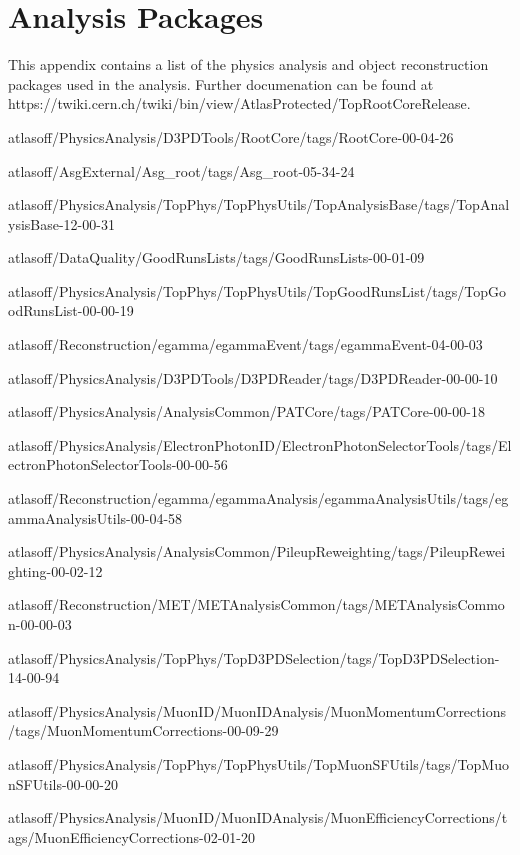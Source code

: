\clearpage
\section{Analysis Packages}
\label{app:packages}
This appendix contains a list of the physics analysis and object reconstruction packages used in the analysis. Further documenation can be found at https://twiki.cern.ch/twiki/bin/view/AtlasProtected/TopRootCoreRelease.

\tiny

atlasoff/PhysicsAnalysis/D3PDTools/RootCore/tags/RootCore-00-04-26

atlasoff/AsgExternal/Asg\_root/tags/Asg\_root-05-34-24

atlasoff/PhysicsAnalysis/TopPhys/TopPhysUtils/TopAnalysisBase/tags/TopAnalysisBase-12-00-31

atlasoff/DataQuality/GoodRunsLists/tags/GoodRunsLists-00-01-09

atlasoff/PhysicsAnalysis/TopPhys/TopPhysUtils/TopGoodRunsList/tags/TopGoodRunsList-00-00-19

atlasoff/Reconstruction/egamma/egammaEvent/tags/egammaEvent-04-00-03

atlasoff/PhysicsAnalysis/D3PDTools/D3PDReader/tags/D3PDReader-00-00-10

atlasoff/PhysicsAnalysis/AnalysisCommon/PATCore/tags/PATCore-00-00-18

atlasoff/PhysicsAnalysis/ElectronPhotonID/ElectronPhotonSelectorTools/tags/ElectronPhotonSelectorTools-00-00-56

atlasoff/Reconstruction/egamma/egammaAnalysis/egammaAnalysisUtils/tags/egammaAnalysisUtils-00-04-58

atlasoff/PhysicsAnalysis/AnalysisCommon/PileupReweighting/tags/PileupReweighting-00-02-12

atlasoff/Reconstruction/MET/METAnalysisCommon/tags/METAnalysisCommon-00-00-03

atlasoff/PhysicsAnalysis/TopPhys/TopD3PDSelection/tags/TopD3PDSelection-14-00-94

atlasoff/PhysicsAnalysis/MuonID/MuonIDAnalysis/MuonMomentumCorrections/tags/MuonMomentumCorrections-00-09-29

atlasoff/PhysicsAnalysis/TopPhys/TopPhysUtils/TopMuonSFUtils/tags/TopMuonSFUtils-00-00-20

atlasoff/PhysicsAnalysis/MuonID/MuonIDAnalysis/MuonEfficiencyCorrections/tags/MuonEfficiencyCorrections-02-01-20

